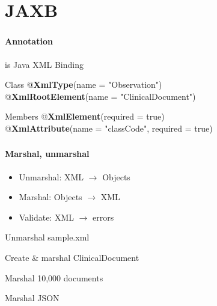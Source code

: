 \documentclass[handout]{beamer}
\begin{document}
\section{JAXB}
\begin{frame}
	\frametitle{\insertsection}
	\framesubtitle{Annotation}
	\begin{block}{is}
		Java XML Binding
	\end{block}
	\begin{block}{Class}
		@\textbf{XmlType}(name = "Observation") \\
		@\textbf{XmlRootElement}(name = "ClinicalDocument") \\
	\end{block}
	\begin{block}{Members}
		@\textbf{XmlElement}(required = true) \\
		@\textbf{XmlAttribute}(name = "classCode", required = true) \\
	\end{block}
\end{frame}

\begin{frame}
	\frametitle{\insertsection}
	\framesubtitle{Marshal, unmarshal}
	\begin{definition}
		\begin{itemize}
			\item Unmarshal: XML $\rightarrow$ Objects
			\item Marshal: Objects $\rightarrow$ XML
			\item Validate: XML $\rightarrow$ errors
		\end{itemize}
	\end{definition}
	\begin{semiverbatim}
		Unmarshal sample.xml
	\end{semiverbatim}
	\begin{semiverbatim}
		Create \& marshal ClinicalDocument
	\end{semiverbatim}
	\begin{semiverbatim}
		Marshal 10,000 documents
	\end{semiverbatim}
	\begin{semiverbatim}
		Marshal JSON
	\end{semiverbatim}
\end{frame}

\end{document}
